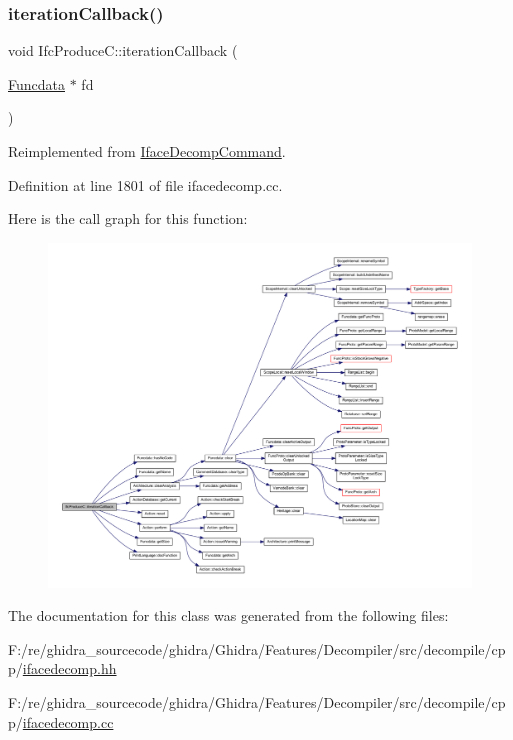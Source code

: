 \subsubsection{\texorpdfstring{iterationCallback()}{iterationCallback()}}
{\footnotesize\ttfamily void Ifc\+Produce\+C\+::iteration\+Callback (\begin{DoxyParamCaption}\item[{\mbox{\hyperlink{class_funcdata}{Funcdata}} $\ast$}]{fd }\end{DoxyParamCaption})\hspace{0.3cm}{\ttfamily [virtual]}}



Reimplemented from \mbox{\hyperlink{class_iface_decomp_command_a619d9358a4e77bef66a26f02ea7a6c8e}{Iface\+Decomp\+Command}}.



Definition at line 1801 of file ifacedecomp.\+cc.

Here is the call graph for this function\+:
\nopagebreak
\begin{figure}[H]
\begin{center}
\leavevmode
\includegraphics[width=350pt]{class_ifc_produce_c_ae7aa419deb8e0f730e574b40ac69b2d7_cgraph}
\end{center}
\end{figure}


The documentation for this class was generated from the following files\+:\begin{DoxyCompactItemize}
\item 
F\+:/re/ghidra\+\_\+sourcecode/ghidra/\+Ghidra/\+Features/\+Decompiler/src/decompile/cpp/\mbox{\hyperlink{ifacedecomp_8hh}{ifacedecomp.\+hh}}\item 
F\+:/re/ghidra\+\_\+sourcecode/ghidra/\+Ghidra/\+Features/\+Decompiler/src/decompile/cpp/\mbox{\hyperlink{ifacedecomp_8cc}{ifacedecomp.\+cc}}\end{DoxyCompactItemize}
